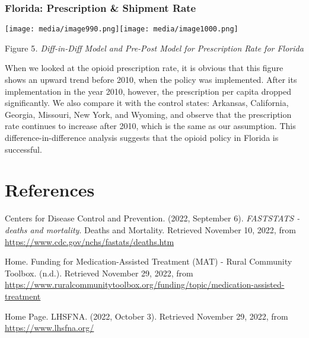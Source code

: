 \documentclass{article}
\begin{document}
\hypertarget{florida-prescription-shipment-rate}{%
\subsubsection{\texorpdfstring{Florida: Prescription \& Shipment Rate
}{Florida: Prescription \& Shipment Rate }}\label{florida-prescription-shipment-rate}}

\texttt{[image: media/image990.png]}\texttt{[image: media/image1000.png]}

Figure 5\emph{. Diff-in-Diff Model and Pre-Post Model for Prescription
Rate for Florida}

When we looked at the opioid prescription rate, it is obvious that this
figure shows an upward trend before 2010, when the policy was
implemented. After its implementation in the year 2010, however, the
prescription per capita dropped significantly. We also compare it with
the control states: Arkansas, California, Georgia, Missouri, New York,
and Wyoming, and observe that the prescription rate continues to
increase after 2010, which is the same as our assumption. This
difference-in-difference analysis suggests that the opioid policy in
Florida is successful.

\section{References}

Centers for Disease Control and Prevention. (2022, September 6).
\emph{FASTSTATS - deaths and mortality}. Deaths and Mortality. Retrieved
November 10, 2022, from
\href{https://www.cdc.gov/nchs/fastats/deaths.htm}{{https://www.cdc.gov/nchs/fastats/deaths.htm}}

Home. Funding for Medication-Assisted Treatment (MAT) - Rural Community
Toolbox. (n.d.). Retrieved November 29, 2022, from
\href{https://www.ruralcommunitytoolbox.org/funding/topic/medication-assisted-treatment}{{https://www.ruralcommunitytoolbox.org/funding/topic/medication-assisted-treatment}}

Home Page. LHSFNA. (2022, October 3). Retrieved November 29, 2022, from
\href{https://www.lhsfna.org/}{{https://www.lhsfna.org/}}
\end{document}
